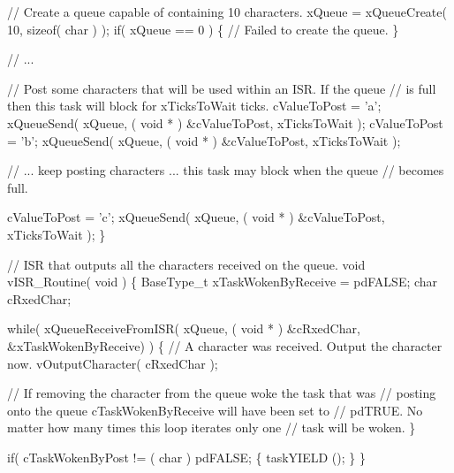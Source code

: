 \begin{DoxyPre}   // Create a queue capable of containing 10 characters.
   xQueue = xQueueCreate( 10, sizeof( char ) );
   if( xQueue == 0 )
   \{
    // Failed to create the queue.
   \}\end{DoxyPre}



\begin{DoxyPre}   // ...\end{DoxyPre}



\begin{DoxyPre}   // Post some characters that will be used within an ISR.  If the queue
   // is full then this task will block for xTicksToWait ticks.
   cValueToPost = 'a';
   xQueueSend( xQueue, ( void * ) &cValueToPost, xTicksToWait );
   cValueToPost = 'b';
   xQueueSend( xQueue, ( void * ) &cValueToPost, xTicksToWait );\end{DoxyPre}



\begin{DoxyPre}   // ... keep posting characters ... this task may block when the queue
   // becomes full.\end{DoxyPre}



\begin{DoxyPre}   cValueToPost = 'c';
   xQueueSend( xQueue, ( void * ) &cValueToPost, xTicksToWait );
\}\end{DoxyPre}



\begin{DoxyPre}// ISR that outputs all the characters received on the queue.
void vISR\_Routine( void )
\{
BaseType\_t xTaskWokenByReceive = pdFALSE;
char cRxedChar;\end{DoxyPre}



\begin{DoxyPre}   while( xQueueReceiveFromISR( xQueue, ( void * ) &cRxedChar, &xTaskWokenByReceive) )
   \{
    // A character was received.  Output the character now.
    vOutputCharacter( cRxedChar );\end{DoxyPre}



\begin{DoxyPre}    // If removing the character from the queue woke the task that was
    // posting onto the queue cTaskWokenByReceive will have been set to
    // pdTRUE.  No matter how many times this loop iterates only one
    // task will be woken.
   \}\end{DoxyPre}



\begin{DoxyPre}   if( cTaskWokenByPost != ( char ) pdFALSE;
   \{
    taskYIELD ();
   \}
\}
\end{DoxyPre}
 